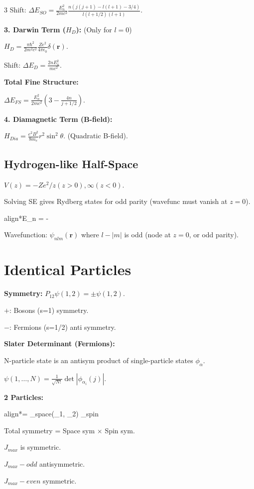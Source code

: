 \documentclass[10pt,a4paper]{article}
\newcommand{\important}[1]{\begin{empheq}[box=\fbox]{align*}#1\end{empheq}}
\begin{document}
\begin{multicols*}{3}
Shift: $\Delta E_{SO} = \frac{E_n^2}{2mc^2} \frac{n(j(j+1)-l(l+1)-3/4)}{l(l+1/2)(l+1)}$.

\textbf{3. Darwin Term ($H_D$):} (Only for $l=0$)

$H_D = \frac{\pi\hbar^2}{2m^2c^2} \frac{Ze^2}{4\pi\epsilon_0} \delta(\mathbf{r})$.

Shift: $\Delta E_D = \frac{2n E_n^2}{mc^2}$.

\textbf{Total Fine Structure:} 

$\Delta E_{FS} = 
\frac{E_n^2}{2mc^2} \left( 3 - \frac{4n}{j+1/2} \right)$.

\textbf{4. Diamagnetic Term (B-field):}

$H_{Dia} = \frac{e^2 B^2}{8 m_e} r^2 \sin^2 \theta$. (Quadratic B-field).

\subsection*{Hydrogen-like Half-Space}

$V(z) = -Ze^2/z (z>0), \infty (z<0)$.

Solving SE gives Rydberg states for odd parity (wavefunc must vanish at $z=0$).
\important{E_n = -}

Wavefunction: $\psi_{nlm}(\mathbf{r})$ where $l-|m|$ is odd (node at $z=0$, or odd parity).

\section*{Identical Particles}

\textbf{Symmetry:} $P_{12}\psi(1,2) = \pm \psi(1,2)$.

$+$: Bosons (s=1) symmetry. 

$-$: Fermions (s=1/2) anti symmetry.

\textbf{Slater Determinant (Fermions):} 

N-particle state is an antisym product of single-particle states $\phi_\alpha$.

$\psi(1, \dots, N) = \frac{1}{\sqrt{N!}} \det | \phi_{\alpha_i}(j) |$.

\textbf{2 Particles:} 
\important{\Psi = \psi_{space}(_1, \vec{r}_2) \chi_{spin}}
Total symmetry = Space sym $\times$ Spin sym.

$J_{max}$ is symmetric.

$J_{max}-odd$ antisymmetric.

$J_{max}-even$ symmetric.


\end{multicols*}
\end{document}
